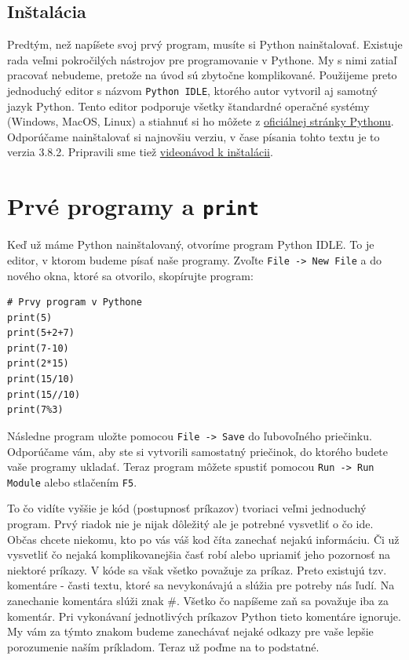 \documentclass{article}
\begin{document}
\subsection{Inštalácia}
Predtým, než napíšete svoj prvý program, musíte si Python nainštalovať. Existuje rada veľmi pokročilých nástrojov pre programovanie v Pythone. My s nimi zatiaľ pracovať nebudeme, pretože na úvod sú zbytočne komplikované.
Použijeme preto jednoduchý editor s názvom \texttt{Python IDLE}, ktorého autor vytvoril aj samotný jazyk Python. Tento editor podporuje všetky štandardné operačné systémy (Windows, MacOS, Linux) a stiahnuť si ho môžete z \href{https://www.python.org/downloads/}{oficiálnej stránky Pythonu}. Odporúčame nainštalovať si najnovšiu verziu, v čase písania tohto textu je to verzia 3.8.2. Pripravili sme tiež \href{https://www.youtube.com/watch?v=_oLcUfkgxSI}{videonávod k inštalácii}.

\section{Prvé programy a \texttt{print}}
Keď už máme Python nainštalovaný, otvoríme program Python IDLE. To je editor, v ktorom budeme písať naše programy. Zvoľte \texttt{File -> New File} a do nového okna, ktoré sa otvorilo, skopírujte program:
\begin{lstlisting}
# Prvy program v Pythone
print(5)
print(5+2+7)
print(7-10)
print(2*15)
print(15/10)
print(15//10)
print(7%3)
\end{lstlisting}
Následne program uložte pomocou \texttt{File -> Save} do ľubovoľného priečinku. Odporúčame vám, aby ste si vytvorili samostatný priečinok, do ktorého budete vaše programy ukladať. Teraz program môžete spustiť pomocou \texttt{Run -> Run Module} alebo stlačením \texttt{F5}. 

To čo vidíte vyššie je kód (postupnosť príkazov) tvoriaci veľmi jednoduchý program. Prvý riadok nie je nijak dôležitý ale je potrebné vysvetliť o čo ide. Občas chcete niekomu, kto po vás váš kod číta zanechať nejakú informáciu. Či už vysvetliť čo nejaká komplikovanejšia časť robí alebo upriamiť jeho pozornosť na niektoré príkazy. V kóde sa však všetko považuje za príkaz. Preto existujú tzv. komentáre - časti textu, ktoré sa nevykonávajú a slúžia pre potreby nás ľudí. Na zanechanie komentára slúži znak $\#$. Všetko čo napíšeme zaň sa považuje iba za komentár. Pri vykonávaní jednotlivých príkazov Python tieto komentáre ignoruje. My vám za týmto znakom budeme zanechávať nejaké odkazy pre vaše lepšie porozumenie naším príkladom. Teraz už poďme na to podstatné.
\end{document}

